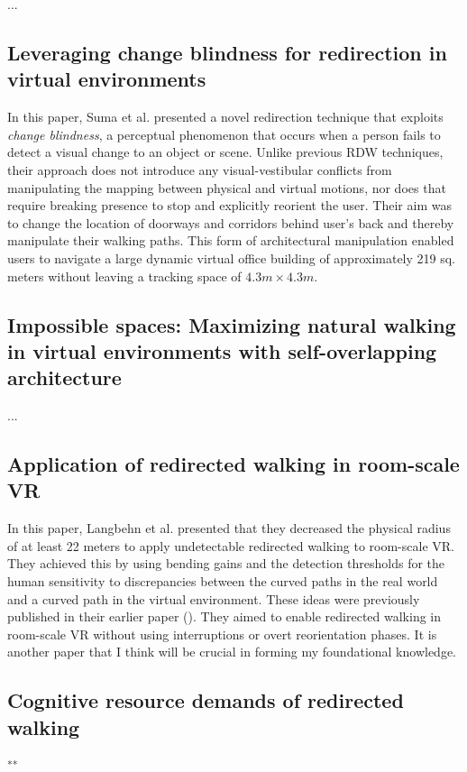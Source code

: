 \documentclass[12pt]{article}
\begin{document}
...

\subsection{Leveraging change blindness for redirection in virtual environments}
\textbf{\cite{suma2011leveraging}}

In this paper, Suma et al. presented a novel redirection technique that exploits \emph{change blindness}, a perceptual phenomenon that occurs when a person fails to detect a visual change to an object or scene. Unlike previous RDW techniques, their approach does not introduce any visual-vestibular conflicts from manipulating the mapping between physical and virtual motions, nor does that require breaking presence to stop and explicitly reorient the user. Their aim was to change the location of doorways and corridors behind user's back and thereby manipulate their walking paths. This form of architectural manipulation enabled users to navigate a large dynamic virtual office building of approximately 219 sq. meters without leaving a tracking space of $4.3m \times 4.3m$.

\subsection{Impossible spaces: Maximizing natural walking in virtual environments with self-overlapping architecture}
\textbf{\cite{suma2012impossible}}

...

\subsection{Application of redirected walking in room-scale VR}
\textbf{\cite{langbehn2017application}}

In this paper, Langbehn et al. presented that they decreased the physical radius of at least 22 meters to apply undetectable redirected walking to room-scale VR. They achieved this by using bending gains and the detection thresholds for the human sensitivity to discrepancies between the curved paths in the real world and a curved path in the virtual environment. These ideas were previously published in their earlier paper (\cite{langbehn2017bending}). They aimed to enable redirected walking in room-scale VR without using interruptions or overt reorientation phases. It is another paper that I think will be crucial in forming my foundational knowledge.

\subsection{Cognitive resource demands of redirected walking}
\textbf{\cite{bruder2015cognitive}}\textsuperscript{**}
\end{document}
